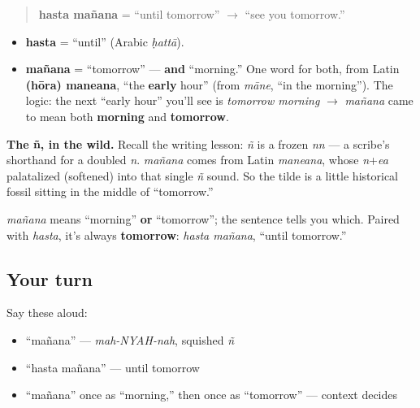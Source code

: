\begin{cousinweb}
\begin{quote}
\textbf{hasta mañana} = \textquotedblleft{}until tomorrow\textquotedblright{} $\to$ \textquotedblleft{}see you tomorrow.\textquotedblright{}
\end{quote}

\begin{itemize}
\raggedright
  \item \textbf{hasta} = \textquotedblleft{}until\textquotedblright{} (Arabic \emph{ḥattā}).
  \item \textbf{mañana} = \textquotedblleft{}tomorrow\textquotedblright{} — \textbf{and} \textquotedblleft{}morning.\textquotedblright{} One word for both, from Latin \textbf{(hōra) maneana}, \textquotedblleft{}the \textbf{early} hour\textquotedblright{} (from \emph{māne}, \textquotedblleft{}in the morning\textquotedblright{}). The logic: the next \textquotedblleft{}early hour\textquotedblright{} you'll see is \emph{tomorrow morning} $\to$ \emph{mañana} came to mean both \textbf{morning} and \textbf{tomorrow}.
\end{itemize}

\textbf{The ñ, in the wild.} Recall the writing lesson: \emph{ñ} is a frozen \emph{nn} — a scribe's shorthand for a doubled \emph{n}. \emph{mañana} comes from Latin \emph{maneana}, whose \emph{n}+\emph{ea} palatalized (softened) into that single \emph{ñ} sound. So the tilde is a little historical fossil sitting in the middle of \textquotedblleft{}tomorrow.\textquotedblright{}
\end{cousinweb}

\begin{grammarlens}[title={Grammar Lens: same word, two meanings — context decides}]
\emph{mañana} means \textquotedblleft{}morning\textquotedblright{} \textbf{or} \textquotedblleft{}tomorrow\textquotedblright{}; the sentence tells you which. Paired with \emph{hasta}, it's always \textbf{tomorrow}: \emph{hasta mañana}, \textquotedblleft{}until tomorrow.\textquotedblright{}
\end{grammarlens}

\subsection*{Your turn}
Say these aloud:

\begin{itemize}
\raggedright
  \item \textquotedblleft{}mañana\textquotedblright{} — \emph{mah-NYAH-nah}, squished \emph{ñ}
  \item \textquotedblleft{}hasta mañana\textquotedblright{} — until tomorrow
  \item “mañana” once as “morning,” then once as “tomorrow” — context decides
\end{itemize}

